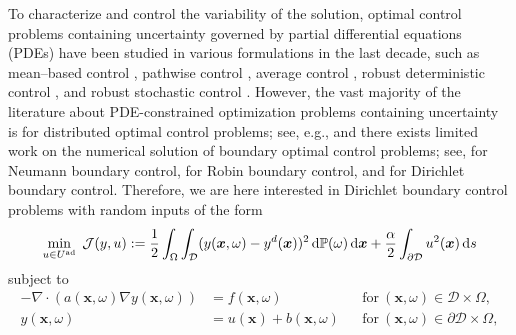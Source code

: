 \documentclass[a4paper,10pt]{article}
\newcommand{\bx}{{\boldsymbol{x}}}
\newcommand{\cD}{{\mathcal{D}}}
\renewcommand{\d}{\textup{d}}
\numberwithin{theorem}{section}
\begin{document}
To characterize and control the variability of the solution, optimal control problems containing uncertainty governed by partial differential equations (PDEs) have been studied in various formulations in the last decade, such as mean--based control \cite{ABorzi_2010a,ABorzi_VSchulz_CSchillings_GvonWinckel_2010a}, pathwise control \cite{FNegri_AManzoni_GRozza_2015,AAAli_EUllman_MHinze_2017}, average control \cite{MLazar_EZuazua_2014,EZuazua_2014}, robust deterministic control \cite{SGarreis_MUlbrich_2017,MDGunzburger_HCLee_JLee_2011a,LSHou_JLee_HManouzi_2011,DPKouri_MHeinkenschloss_DRidzal_BGWaanders_2013,HCLee_JLee_2013,ERosseel_GNWells_2012,PCiloglu_HYucel_2023}, and   robust stochastic control \cite{PBenner_AOnwunto_MStoll_2016,PChen_AQuarteroni_GRozza_2013,AKunoth_CSchwab_2016,HTiesler_RMKirby_DXiu_TPreusser_2012a,JMFrutos_MKessler_AMunch_FPeriago_2016}. However, the vast majority of the literature about PDE-constrained optimization problems containing uncertainty  is for distributed optimal control problems; see, e.g., \cite{ABorzi_2010a,FNegri_AManzoni_GRozza_2015,AAAli_EUllman_MHinze_2017,EZuazua_2014,SGarreis_MUlbrich_2017,
LSHou_JLee_HManouzi_2011,DPKouri_MHeinkenschloss_DRidzal_BGWaanders_2013,HCLee_JLee_2013,ERosseel_GNWells_2012,PBenner_AOnwunto_MStoll_2016,AKunoth_CSchwab_2016,HTiesler_RMKirby_DXiu_TPreusser_2012a} and there exists limited work on the numerical solution of boundary optimal control problems; see, \cite{MDGunzburger_HCLee_JLee_2011a} for Neumann boundary control, \cite{PChen_AQuarteroni_GRozza_2013,JMFrutos_MKessler_AMunch_FPeriago_2016}  for Robin boundary control, and \cite{WZhao_MGunzburger_2023} for Dirichlet boundary control. Therefore, we are here interested in Dirichlet boundary control problems with random inputs of the form
\begin{eqnarray}\label{eqn:objec}
	\min \limits_{u \in U^{\textup{ad}}} \; \mathcal{J}(y,u) := \frac{1}{2} \int_{\Omega} \int_{\cD} (y(\bx, \omega)-y^d(\bx))^2 \, \d \mathbb{P}(\omega) \, \d\bx +  \frac{\alpha}{2} \int_{\partial \cD}  u^2(\bx) \,  \d s
\end{eqnarray}
subject to 
\begin{subequations}\label{eqn:constPDE}
  \begin{align}
    -\nabla \cdot (a(\bx,\omega) \nabla y(\bx, \omega)) &= f(\bx,\omega)               &&       \text{for}\ (\bx,\omega) \in \cD         \times \Omega,\\
     y(\bx, \omega) &= u(\bx) + b(\bx,\omega)  &&       \text{for}\ (\bx,\omega) \in \partial\cD \times \Omega,
  \end{align}
\end{subequations}
\end{document}
